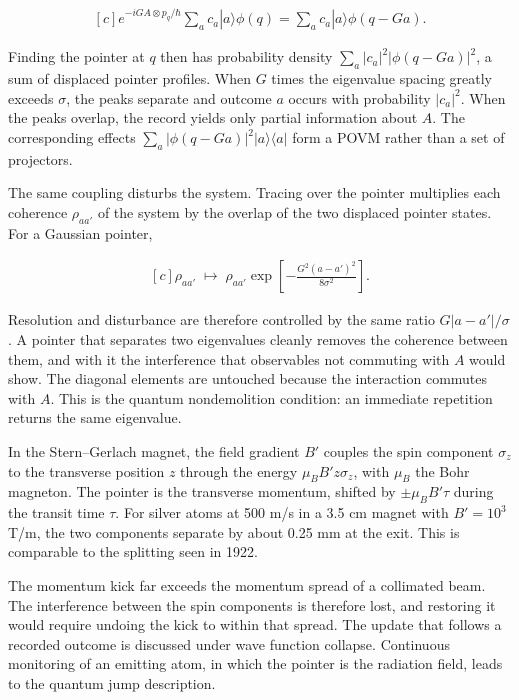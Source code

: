 \documentclass[11pt,oneside]{book}
\newenvironment{centeredalign}{\[\begin{gathered}[c]}{\end{gathered}\]}
\begin{document}
\begin{centeredalign}
e^{-iGA\otimes p_q/\hbar}\sum_ac_a|a\rangle\phi(q)
=\sum_ac_a|a\rangle\phi(q-Ga).
\end{centeredalign}

Finding the pointer at \(q\) then has probability density \(\sum_a|c_a|^2|\phi(q-Ga)|^2\), a sum of displaced pointer profiles. When \(G\) times the eigenvalue spacing greatly exceeds \(\sigma\), the peaks separate and outcome \(a\) occurs with probability \(|c_a|^2\). When the peaks overlap, the record yields only partial information about \(A\). The corresponding effects \(\sum_a|\phi(q-Ga)|^2|a\rangle\langle a|\) form a POVM rather than a set of projectors.

The same coupling disturbs the system. Tracing over the pointer multiplies each coherence \(\rho_{aa'}\) of the system by the overlap of the two displaced pointer states. For a Gaussian pointer,

\begin{centeredalign}
\rho_{aa'}\;\longmapsto\;\rho_{aa'}\exp\!\left[-\frac{G^2(a-a')^2}{8\sigma^2}\right].
\end{centeredalign}

Resolution and disturbance are therefore controlled by the same ratio \(G|a-a'|/\sigma\). A pointer that separates two eigenvalues cleanly removes the coherence between them, and with it the interference that observables not commuting with \(A\) would show. The diagonal elements are untouched because the interaction commutes with \(A\). This is the quantum nondemolition condition: an immediate repetition returns the same eigenvalue.

In the Stern--Gerlach magnet, the field gradient \(B'\) couples the spin component \(\sigma_z\) to the transverse position \(z\) through the energy \(\mu_BB'z\sigma_z\), with \(\mu_B\) the Bohr magneton. The pointer is the transverse momentum, shifted by \(\pm\mu_BB'\tau\) during the transit time \(\tau\). For silver atoms at 500 m/s in a 3.5 cm magnet with \(B'=10^3\) T/m, the two components separate by about 0.25 mm at the exit. This is comparable to the splitting seen in 1922.

The momentum kick far exceeds the momentum spread of a collimated beam. The interference between the spin components is therefore lost, and restoring it would require undoing the kick to within that spread. The update that follows a recorded outcome is discussed under wave function collapse. Continuous monitoring of an emitting atom, in which the pointer is the radiation field, leads to the quantum jump description.
\end{document}
